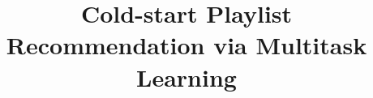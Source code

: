 \documentclass[sigconf]{acmart}
\begin{document}
\title{Cold-start Playlist Recommendation via Multitask Learning}



%
%


\begin{abstract}

\end{abstract}

\maketitle











\clearpage
\newpage
\onecolumn
\appendix


\end{document}
